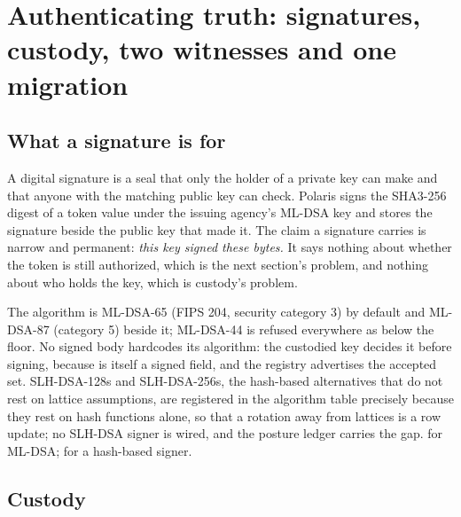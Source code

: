 \section{Authenticating truth: signatures, custody, two witnesses and one migration}
\label{sec:signatures}



\subsection{What a signature is for}

A digital signature is a seal that only the holder of a private key can make and that anyone with
the matching public key can check. Polaris signs the SHA3-256 digest of a token value under the
issuing agency's ML-DSA key and stores the signature beside the public key that made it. The claim
a signature carries is narrow and permanent: \emph{this key signed these bytes.} It says nothing
about whether the token is still authorized, which is the next section's problem, and nothing about
who holds the key, which is custody's problem. \sImpl

The algorithm is ML-DSA-65 (FIPS 204, security category 3) by default and ML-DSA-87 (category 5)
beside it; ML-DSA-44 is refused everywhere as below the floor. No signed body hardcodes its
algorithm: the custodied key decides it before signing, because  is itself a signed
field, and the registry advertises the accepted set. SLH-DSA-128s and SLH-DSA-256s, the hash-based
alternatives that do not rest on lattice assumptions, are registered in the algorithm table
precisely because they rest on hash functions alone, so that a rotation away from lattices is a row
update; no SLH-DSA signer is wired, and the posture ledger carries the gap. \sImplMark{} for ML-DSA;
\sFut{} for a hash-based signer.

\subsection{Custody}

